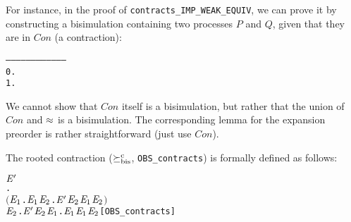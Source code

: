 For instance, in the proof of \texttt{contracts_IMP_WEAK_EQUIV},
we can prove it by constructing a bisimulation  containing two processes
$P$ and $Q$, given that they are in $Con$ (a contraction):
\begin{alltt}
   ------------------------------------
    0.  
    1.  
\end{alltt}
We cannot show that $Con$ itself is a bisimulation, but rather
that the union of $Con$ and $\approx$ is a bisimulation.
The corresponding lemma for the expansion preorder is rather
straightforward (just use $Con$).

The rooted contraction ($\mathrel{\succeq^{\rm{c}}_{\rm{bis}}}$, \texttt{OBS_contracts}) is formally
defined as follows:
\begin{alltt}
    \HOLSymConst{\HOLTokenObsContracts} \ensuremath{\HOLFreeVar{E}\sp{\prime}} \HOLTokenDefEquality{}
     \HOLSymConst{\HOLTokenForall{}}.
         \ensuremath{(}\HOLSymConst{\HOLTokenForall{}}\ensuremath{\HOLBoundVar{E}\sb{\mathrm{1}}}.  \HOLTokenTransBegin{}\HOLTokenTransEnd \ensuremath{\HOLBoundVar{E}\sb{\mathrm{1}}} \HOLSymConst{\HOLTokenImp{}} \HOLSymConst{\HOLTokenExists{}}\ensuremath{\HOLBoundVar{E}\sb{\mathrm{2}}}. \ensuremath{\HOLFreeVar{E}\sp{\prime}} \HOLTokenTransBegin{}\HOLTokenTransEnd \ensuremath{\HOLBoundVar{E}\sb{\mathrm{2}}} \HOLSymConst{\HOLTokenConj{}} \ensuremath{\HOLBoundVar{E}\sb{\mathrm{1}}} \HOLSymConst{\HOLTokenContracts{}} \ensuremath{\HOLBoundVar{E}\sb{\mathrm{2}}}\ensuremath{)} \HOLSymConst{\HOLTokenConj{}}
         \HOLSymConst{\HOLTokenForall{}}\ensuremath{\HOLBoundVar{E}\sb{\mathrm{2}}}. \ensuremath{\HOLFreeVar{E}\sp{\prime}} \HOLTokenTransBegin{}\HOLTokenTransEnd \ensuremath{\HOLBoundVar{E}\sb{\mathrm{2}}} \HOLSymConst{\HOLTokenImp{}} \HOLSymConst{\HOLTokenExists{}}\ensuremath{\HOLBoundVar{E}\sb{\mathrm{1}}}.  \HOLTokenWeakTransBegin{}\HOLTokenWeakTransEnd \ensuremath{\HOLBoundVar{E}\sb{\mathrm{1}}} \HOLSymConst{\HOLTokenConj{}} \ensuremath{\HOLBoundVar{E}\sb{\mathrm{1}}} \HOLSymConst{\HOLTokenWeakEQ} \ensuremath{\HOLBoundVar{E}\sb{\mathrm{2}}}\hfill{[OBS_contracts]}
\end{alltt}

